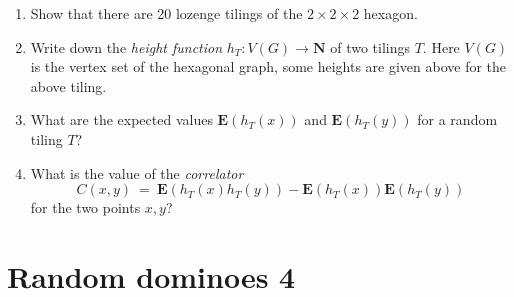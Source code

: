 \documentclass[11pt,fleqn]{book} %
\begin{document}
\begin{problem}
\begin{center}
 \end{center} 
 \begin{enumerate}[label =\alph*.]
  \item Show that there are 20 lozenge tilings of the $2\times 2 \times 2$ hexagon. 
  \item Write down the \textit{height function} $h_T:V(G)\to \mathbf{N}$ of two tilings $T$. Here $V(G)$ is the vertex set of  the hexagonal graph, some heights are given above for the above tiling.
  \item What are the expected values $\textbf{E}(h_T(x))$ and $\textbf{E}(h_T(y))$ for a random tiling $T$?
  \item What is the value of the \textit{correlator} 
   $$C(x,y) \ = \ \textbf{E}(h_T(x)h_T(y)) - \textbf{E}(h_T(x))\textbf{E}(h_T(y))$$
   for the two points $x,y$?
 \end{enumerate}
\end{problem}














\newpage 
 \chapter{Random dominoes 4}


\setcounter{problem}{0}
\end{document}
